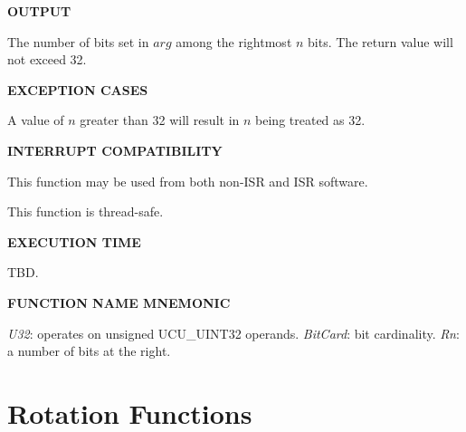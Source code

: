\noindent\textbf{OUTPUT}
\begin{list}{}{\setlength{\leftmargin}{0.25in}\setlength{\topsep}{0.0in}}
\item  The number of bits set in $arg$ among the
       rightmost $n$ bits.  The return value will not exceed 32.
\end{list}
\vspace{2.8ex}

\noindent\textbf{EXCEPTION CASES}
\begin{list}{}{\setlength{\leftmargin}{0.25in}\setlength{\topsep}{0.0in}}
\item A value of $n$ greater than 32 will result in $n$ being treated
      as 32.
\end{list}
\vspace{2.8ex}

\noindent\textbf{INTERRUPT COMPATIBILITY}
\begin{list}{}{\setlength{\leftmargin}{0.25in}\setlength{\topsep}{0.0in}}
\item This function may be used from both non-ISR and ISR software.
\item This function is thread-safe.
\end{list}
\vspace{2.8ex}

\noindent\textbf{EXECUTION TIME}
\begin{list}{}{\setlength{\leftmargin}{0.25in}\setlength{\topsep}{0.0in}}
\item TBD.
\end{list}
\vspace{2.8ex}

\noindent\textbf{FUNCTION NAME MNEMONIC}
\begin{list}{}{\setlength{\leftmargin}{0.25in}\setlength{\topsep}{0.0in}}
\item \emph{U32}: operates on unsigned UCU\_UINT32 operands.
      \emph{BitCard}: bit cardinality.
      \emph{Rn}: a number of bits at the right.
\end{list}


\section{Rotation Functions}
\label{cbsf0:srof0}


